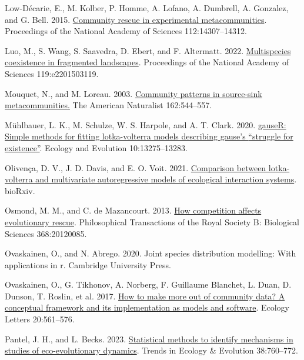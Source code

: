 \documentclass[
]{article}
\newlength{\cslhangindent}
\newlength{\cslentryspacingunit} %
\newenvironment{CSLReferences}[2] %
 {%
  \setlength{\parindent}{0pt}
  \ifodd #1
  \let\oldpar\par
  \def\par{\hangindent=\cslhangindent\oldpar}
  \fi
  \setlength{\parskip}{#2\cslentryspacingunit}
 }%
 {}
\begin{document}
\begin{CSLReferences}{0}{0}
\leavevmode{}%
Low-Décarie, E., M. Kolber, P. Homme, A. Lofano, A. Dumbrell, A. Gonzalez, and G. Bell. 2015. \href{https://doi.org/10.1073/pnas.1513125112}{Community rescue in experimental metacommunities}. Proceedings of the National Academy of Sciences 112:14307--14312.

\leavevmode{}%
Luo, M., S. Wang, S. Saavedra, D. Ebert, and F. Altermatt. 2022. \href{https://doi.org/10.1073/pnas.2201503119}{Multispecies coexistence in fragmented landscapes}. Proceedings of the National Academy of Sciences 119:e2201503119.

\leavevmode{}%
Mouquet, N., and M. Loreau. 2003. \href{https://doi.org/10.1086/378857}{Community patterns in source‐sink metacommunities.} The American Naturalist 162:544--557.

\leavevmode{}%
Mühlbauer, L. K., M. Schulze, W. S. Harpole, and A. T. Clark. 2020. \href{https://doi.org/10.1002/ece3.6926}{gauseR: Simple methods for fitting lotka-volterra models describing gause's {``struggle for existence''}}. Ecology and Evolution 10:13275--13283.

\leavevmode{}%
Olivença, D. V., J. D. Davis, and E. O. Voit. 2021. \href{https://doi.org/10.1101/2021.10.07.463461}{Comparison between lotka-volterra and multivariate autoregressive models of ecological interaction systems}. bioRxiv.

\leavevmode{}%
Osmond, M. M., and C. de Mazancourt. 2013. \href{https://doi.org/10.1098/rstb.2012.0085}{How competition affects evolutionary rescue}. Philosophical Transactions of the Royal Society B: Biological Sciences 368:20120085.

\leavevmode{}%
Ovaskainen, O., and N. Abrego. 2020. Joint species distribution modelling: With applications in r. Cambridge University Press.

\leavevmode{}%
Ovaskainen, O., G. Tikhonov, A. Norberg, F. Guillaume Blanchet, L. Duan, D. Dunson, T. Roslin, et al. 2017. \href{https://doi.org/10.1111/ele.12757}{How to make more out of community data? A conceptual framework and its implementation as models and software}. Ecology Letters 20:561--576.

\leavevmode{}%
Pantel, J. H., and L. Becks. 2023. \href{https://doi.org/10.1016/j.tree.2023.03.011}{Statistical methods to identify mechanisms in studies of eco-evolutionary dynamics}. Trends in Ecology {\&} Evolution 38:760--772.


\end{CSLReferences}
\end{document}
